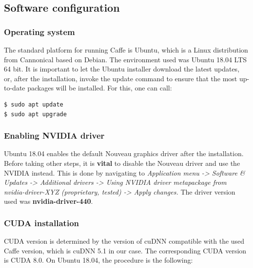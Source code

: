 \newpage
\subsection{Software configuration} 

\subsubsection{Operating system} 

The standard platform for running Caffe is Ubuntu, which is a Linux distribution from Cannonical based on Debian. The environment used was Ubuntu 18.04 LTS 64 bit. It is important to let the Ubuntu installer download the latest updates, or, after the installation, invoke the update command to ensure that the most up-to-date packages will be installed. For this, one can call:

\begin{lstlisting}[language=bash]
$ sudo apt update
$ sudo apt upgrade
\end{lstlisting}

\subsubsection{Enabling NVIDIA driver}

Ubuntu 18.04 enables the default Nouveau graphics driver after the installation. Before taking other steps, it is \textbf{vital} to disable the Nouveau driver and use the NVIDIA instead. This is done by navigating to \textit{Application menu -> Software \& Updates -> Additional drivers
	-> Using NVIDIA driver metapackage from nvidia-driver-XYZ (proprietary, tested) -> Apply changes.} The driver version used was \textbf{nvidia-driver-440}.


\subsubsection{CUDA installation}

CUDA version is determined by the version of cuDNN compatible with the used Caffe version, which is cuDNN 5.1 in our case. The corresponding CUDA version is CUDA 8.0. On Ubuntu 18.04, the procedure is the following:

